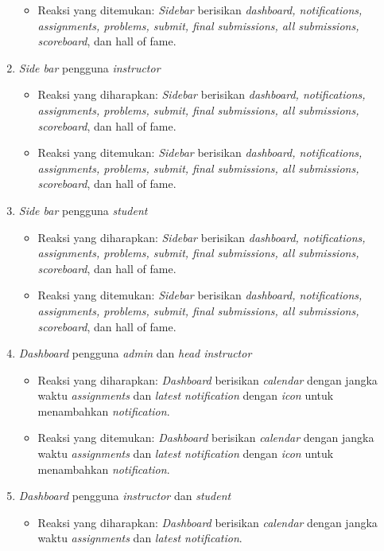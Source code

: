 \begin{enumerate}
\begin{itemize}
	 	\item Reaksi yang ditemukan: \textit{Sidebar} berisikan \textit{dashboard, notifications, assignments, problems, submit, final submissions, all submissions, scoreboard}, dan hall of fame.
	 \end{itemize}
	 \item \textit{Side bar} pengguna \textit{instructor}
	 \begin{itemize}
	 	\item Reaksi yang diharapkan: \textit{Sidebar} berisikan \textit{dashboard, notifications, assignments, problems, submit, final submissions, all submissions, scoreboard}, dan hall of fame.
	 	\item Reaksi yang ditemukan: \textit{Sidebar} berisikan \textit{dashboard, notifications, assignments, problems, submit, final submissions, all submissions, scoreboard}, dan hall of fame.
	 \end{itemize}
	 \item \textit{Side bar} pengguna \textit{student}
	 \begin{itemize}
	 	\item Reaksi yang diharapkan: \textit{Sidebar} berisikan \textit{dashboard, notifications, assignments, problems, submit, final submissions, all submissions, scoreboard}, dan hall of fame.
	 	\item Reaksi yang ditemukan: \textit{Sidebar} berisikan \textit{dashboard, notifications, assignments, problems, submit, final submissions, all submissions, scoreboard}, dan hall of fame.
	 \end{itemize}
	 \item \textit{Dashboard} pengguna \textit{admin} dan \textit{head instructor}
	 \begin{itemize}
	 	\item Reaksi yang diharapkan: \textit{Dashboard} berisikan \textit{calendar} dengan jangka waktu \textit{assignments} dan \textit{latest notification} dengan \textit{icon} untuk menambahkan \textit{notification}.
	 	\item Reaksi yang ditemukan: \textit{Dashboard} berisikan \textit{calendar} dengan jangka waktu \textit{assignments} dan \textit{latest notification} dengan \textit{icon} untuk menambahkan \textit{notification}.
	 \end{itemize}
	 \item \textit{Dashboard} pengguna \textit{instructor} dan \textit{student}
	 \begin{itemize}
	 	\item Reaksi yang diharapkan: \textit{Dashboard} berisikan \textit{calendar} dengan jangka waktu \textit{assignments} dan \textit{latest notification}.

\end{itemize}
\end{enumerate}
